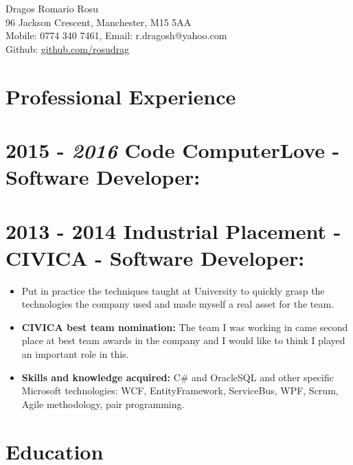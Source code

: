 \documentclass[12pt,a4paper]{res}
\begin{document}
\thispagestyle{empty}
  \begin{center}
  \Large{Dragos Romario Rosu  \\ [12pt]}
  \normalsize 96 Jackson Crescent, Manchester, M15 5AA\\
  Mobile: 0774 340 7461, Email: r.dragosh@yahoo.com\\
  Github: \url{github.com/rosudrag}
  \end{center}
  
\begin{resume}
\vspace{-10mm}
\section{\large\bf Professional Experience}

\section{\bf 2015 - \textit{2016} \hspace{0.3mm} Code ComputerLove - Software Developer:}
\vspace{5mm}    
\section{\bf 2013 - 2014 \hspace{0.5mm} Industrial Placement - CIVICA - Software Developer:}
\vspace{5mm}    
	\begin{itemize}
	\item[] Put in practice the techniques taught at University to quickly grasp the technologies the company used and made myself a real asset for the team.
	\item{\bf CIVICA best team nomination:} The team I was working in came second place at best team awards in the company and I would like to think I played an important role in this.
	\item{\bf Skills and knowledge acquired:} C\# and OracleSQL and other specific Microsoft technologies: WCF, EntityFramework, ServiceBus, WPF, Scrum, Agile methodology, pair programming.
	\end{itemize}


\section{\large\bf Education}
\vspace{5mm}


\end{resume}
\end{document}
